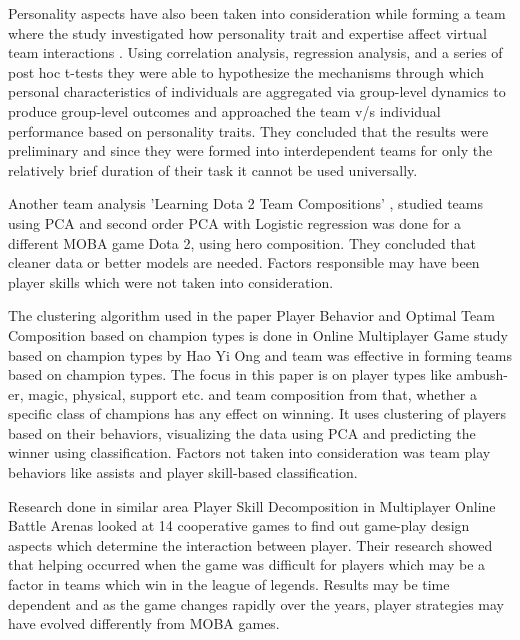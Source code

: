 \documentclass[conference]{IEEEtran}
\begin{document}
 Personality aspects have also been taken into consideration while forming a team where the study investigated how personality trait and expertise affect virtual team interactions \cite{Balthazard2004}. Using correlation analysis, regression analysis, and a series of post hoc t-tests they were able to hypothesize the mechanisms through which personal characteristics of individuals are aggregated via group-level dynamics to produce group-level outcomes and approached the  team v/s individual performance based on personality traits. They concluded that the results were preliminary and since they were formed into interdependent teams for only the relatively brief duration of their task it cannot be used universally.

Another team analysis 'Learning Dota 2 Team Compositions' \cite{Agarwala2014}, studied teams using PCA and second order PCA with Logistic regression was done for a different MOBA game Dota 2, using hero composition. They concluded that cleaner data or better models are needed. Factors responsible may have been player skills which were not taken into consideration.

The clustering algorithm used in the paper Player Behavior and Optimal Team Composition based on champion types is done in Online Multiplayer Game study based on champion types by Hao Yi Ong and team \cite{Bainbridge2009} was effective in forming teams based on champion types. The focus in this paper is on player types like ambush-er, magic, physical, support etc. and team composition from that, whether a specific class of champions has any effect on winning. It uses clustering of players based on their behaviors, visualizing the data using PCA and predicting the winner using classification. Factors not taken into consideration was team play behaviors like assists and player skill-based classification.

Research done in similar area  Player Skill Decomposition in Multiplayer Online Battle Arenas \cite{Chen2016} looked at 14 cooperative games to find out game-play design aspects which determine the interaction between player. Their research showed that helping occurred when the game was difficult for players which may be a factor in teams which win in the league of legends. Results may be time dependent and as the game changes rapidly over the years, player strategies may have evolved differently from MOBA games. 
\end{document}
